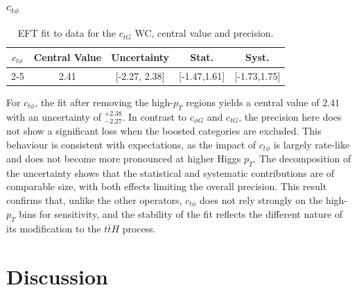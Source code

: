 \subsubsection{$c_{t\phi}$}
\begin{table}[h!]
\centering
\begin{tabular}{|c|c|c|c|c|}
\hline
\multirow{2}{*}{\textbf{$c_{t\phi }$}} & \textbf{Central Value} & \textbf{Uncertainty} &\textbf{Stat.}&\textbf{Syst.}\\
\cline{2-5}
& 2.41 & [-2.27, 2.38]& [-1.47,1.61]
& [-1.73,1.75]
\\
\hline
\end{tabular}

    \caption{EFT fit to data for the $c_{t G}$ WC, central value and precision.}
    \label{tab:c_tG_linear}
\end{table}
For $c_{t\phi}$, the fit after removing the high-$p_{T}$ regions yields a central value of $2.41$ with an uncertainty of $^{+2.38}_{-2.27}$. In contrast to $c_{\phi G}$ and $c_{tG}$, the precision here does not show a significant loss when the boosted categories are excluded. This behaviour is consistent with expectations, as the impact of $c_{t\phi}$ is largely rate-like and does not become more pronounced at higher Higgs $p_{T}$. The decomposition of the uncertainty shows that the statistical and systematic contributions are of comparable size, with both effects limiting the overall precision. This result confirms that, unlike the other operators, $c_{t\phi}$ does not rely strongly on the high-$p_{T}$ bins for sensitivity, and the stability of the fit reflects the different nature of its modification to the $t\bar{t}H$ process.

\section{Discussion}

